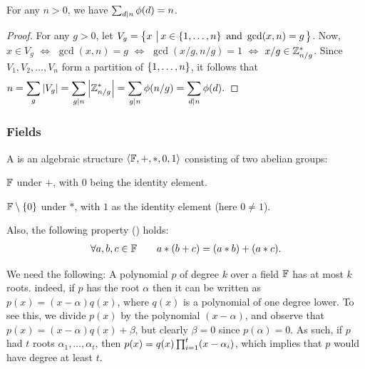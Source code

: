 \begin{lemma}
    For any $n > 0$, we have $\sum_{d \mid n} \phi(d) =n$.
\end{lemma}
\begin{proof}
    For any $g > 0$, let $V_g = \left\{ { x \,\left|\, { x \in \left\{ {1, \ldots, n} \right\}
          \text{ and } \gcd(x, n) = g} \bigr.\right.} \right\}$. Now, $x \in V_g$ $\iff$
    $\gcd(x,n) = g$ $\iff$ $\gcd(x/g, n/g) = 1$ $\iff$ $x/g \in
    \mathbb{Z}_{n/g}^*$. Since $V_1, V_2, \ldots, V_n$ form a partition of
    $\left\{ {1,\ldots, n} \right\}$, it follows that
    \begin{math}
        \ds \Biggl. n%
        =%
        \sum_g \cardin{V_g}%
        =%
        \sum_{g \divides n} \cardin{\ZZ_{n/g}^*}%
        =%
        \sum_{g \divides n} \phi(n/g)%
        =%
        \sum_{d \divides n} \phi(d).
    \end{math}
\end{proof}




\subsubsection{Fields}

\begin{defn}
    A  is an algebraic structure $\left\langle {\mathbb{F}, +, *,
       0, 1} \right\rangle$ consisting of two abelian groups:
    \begin{compactenumA}
        \item $\mathbb{F}$ under $+$, with $0$ being the identity element.
        
        \item $\mathbb{F} \setminus \left\{ {0} \right\}$ under $*$, with $1$ as the
        identity element (here $0 \neq 1$).
    \end{compactenumA}
    Also, the following property () holds:
    \begin{align*}
        \forall a,b,c \in \mathbb{F} \qquad a * (b + c) = (a*b) + (a*c).
    \end{align*}
\end{defn}

We need the following: A polynomial $p$ of degree $k$ over a field
$\mathbb{F}$ has at most $k$ roots. indeed, if $p$ has the root $\alpha$
then it can be written as $p(x) = (x-\alpha) q(x)$, where $q(x)$ is a
polynomial of one degree lower. To see this, we divide $p(x)$ by the
polynomial $(x-\alpha)$, and observe that $p(x) = (x-\alpha) q(x) +
\beta$, but clearly $\beta = 0$ since $p(\alpha) = 0$. As such, if $p$
had $t$ roots $\alpha_1,\ldots, \alpha_t$, then $p(x) = q(x)
\prod_{i=1}^t \pth[]{x-\alpha_i}$, which implies that $p$ would have
degree at least $t$.



